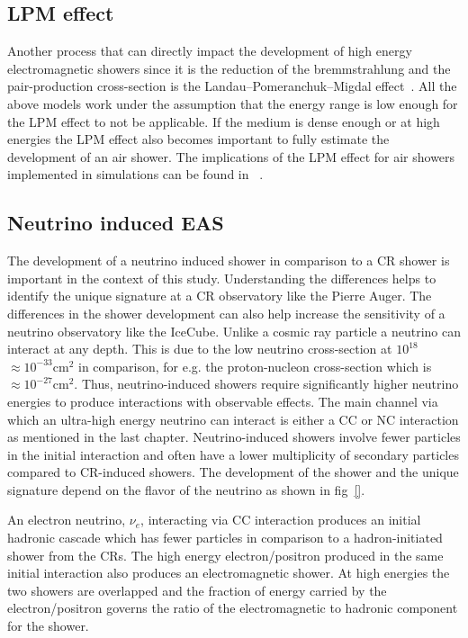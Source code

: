\subsection*{LPM effect}
Another process that can directly impact the development of high energy electromagnetic showers since it is the reduction of the bremmstrahlung and the pair-production cross-section is the Landau–Pomeranchuk–Migdal effect~\cite{Landau:1953um,PhysRev.103.1811}. All the above models work under the assumption that the energy range is low enough for the LPM effect to not be applicable. If the medium is dense enough or at high energies the LPM effect also becomes important to fully estimate the development of an air shower. The implications of the LPM effect for air showers implemented in simulations can be found in ~\cite{sandrock2023validationelectromagneticshowerscorsika}. 

\subsection*{Neutrino induced EAS}
\label{sec:Dev_Nu}
The development of a neutrino induced shower in comparison to a CR shower is important in the context of this study. Understanding the differences helps to identify the unique signature at a CR observatory like the Pierre Auger. The differences in the shower development can also help increase the sensitivity of a neutrino observatory like the IceCube. Unlike a cosmic ray particle a neutrino can interact at any depth. This is due to the low neutrino cross-section at $10^{18}$ $\approx 10^{-33} \mathrm{cm^2}$  in comparison, for e.g. the proton-nucleon cross-section which is $\approx 10^{-27} \mathrm{cm^2}$. Thus, neutrino-induced showers require significantly higher neutrino energies to produce interactions with observable effects. The main channel via which an ultra-high energy neutrino can interact is either a CC or NC interaction as mentioned in the last chapter. Neutrino-induced showers involve fewer particles in the initial interaction and often have a lower multiplicity of secondary particles compared to CR-induced showers. The development of the shower and the unique signature depend on the flavor of the neutrino as shown in fig~\ref{}.

An electron neutrino, $\nu_e$, interacting via CC interaction produces an initial hadronic cascade which has fewer particles in comparison to a hadron-initiated shower from the CRs. The high energy electron/positron produced in the same initial interaction also produces an electromagnetic shower. At high energies the two showers are overlapped and the fraction of energy carried by the electron/positron governs the ratio of the electromagnetic to hadronic component for the shower.

